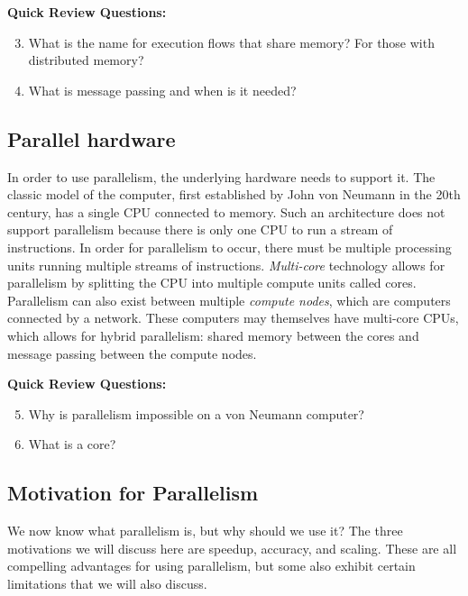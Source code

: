 \documentclass[a4paper, 11pt]{article}
\begin{document}
\bigskip
\textbf{Quick Review Questions:}

\begin{enumerate}
\setcounter{enumi}{2}
\item What is the name for execution flows that share memory? For those with distributed memory?
\item What is message passing and when is it needed?
\end{enumerate}


\subsection{Parallel hardware}

In order to use parallelism, the underlying hardware needs to support it. The classic model of the computer, first established by John von Neumann in the 20th century, has a single CPU connected to memory. Such an architecture does not support parallelism because there is only one CPU to run a stream of instructions. In order for parallelism to occur, there must be multiple processing units running multiple streams of instructions. \emph{Multi-core} technology allows for parallelism by splitting the CPU into multiple compute units called cores. Parallelism can also exist between multiple \emph{compute nodes}, which are computers connected by a network. These computers may themselves have multi-core CPUs, which allows for hybrid parallelism: shared memory between the cores and message passing between the compute nodes.

\bigskip
\textbf{Quick Review Questions:}

\begin{enumerate}
\setcounter{enumi}{4}
\item Why is parallelism impossible on a von Neumann computer?
\item What is a core?
\end{enumerate}


\subsection{Motivation for Parallelism}

We now know what parallelism is, but why should we use it? The three motivations we will discuss here are speedup, accuracy, and scaling. These are all compelling advantages for using parallelism, but some also exhibit certain limitations that we will also discuss.
\end{document}
